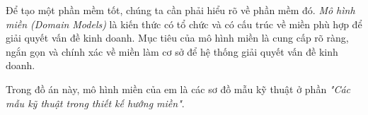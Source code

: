 Để tạo một phần mềm tốt, chúng ta cần phải hiểu rõ về phần mềm đó. \emph{Mô hình miền (Domain Models)} là kiến thức có tổ chức và có cấu trúc về miền phù hợp để giải quyết vấn đề kinh doanh. Mục tiêu của mô hình miền là cung cấp rõ ràng, ngắn gọn và chính xác về miền làm cơ sở để hệ thống giải quyết vấn đề kinh doanh.

\begin{example} Trong đồ án này, mô hình miền của em là các sơ đồ mẫu kỹ thuật ở phần \emph{"Các mẫu kỹ thuật trong thiết kế hướng miền"}. \end{example}



 